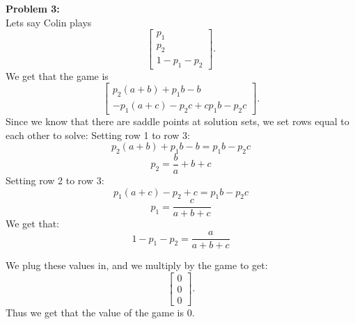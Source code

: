\documentclass[12pt]{article}
\begin{document}
\noindent
\textbf{Problem 3: } \\

Lets say Colin plays 
 \[
\begin{bmatrix}
	p_1 \\
	p_2 \\ 
	1- p_1 - p_2
\end{bmatrix}
.\] 
We get that the game is 
\[
\begin{bmatrix}
	p_2(a+b)+p_1b-b \\
	-p_1(a+c)-p_2c+c
	p_1b-p_2c
\end{bmatrix}
.\] 
Since we know that there are saddle points at solution sets, we set rows equal to each other to solve:
Setting row 1 to row 3:
$$p_2(a+b)+p_1b-b = p_1b-p_2c$$
$$p_2 = \frac{b}{a}+b+c$$
Setting row 2 to row 3:
$$p_1(a+c)-p_2+c=p_1b-p_2c$$
$$p_1 = \frac{c}{a+b+c}$$
We get that: 
$$1-p_1-p_2 = \frac{a}{a+b+c}$$

We plug these values in, and we multiply by the game to get: 
\[
\begin{bmatrix}
	0 \\
	0 \\
	0
\end{bmatrix}
.\] 
Thus we get that the value of the game is 0.
\end{document}
